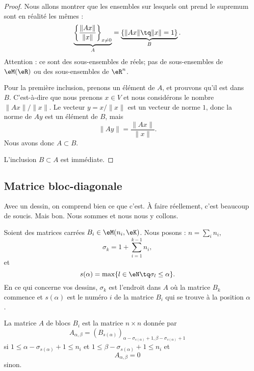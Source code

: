 \begin{proof}
	Nous allons montrer que les ensembles sur lesquels ont prend le supremum sont en réalité les mêmes :
	\begin{equation}
		\underbrace{\left\{ \frac{ \| Ax \| }{ \| x \| }\right\}_{x\neq 0}}_{A}=\underbrace{\left\{ \| Ax \|\tq \| x \|=1 \right\}}_{B}.
	\end{equation}
	Attention : ce sont des sous-ensembles de réels; pas de sous-ensembles de \( \eM(\eR)\) ou des sous-ensembles de \( \eR^n\).

	Pour la première inclusion, prenons un élément de \( A\), et prouvons qu'il est dans \( B\). C'est-à-dire que nous prenons \( x\in V\) et nous considérons le nombre \( \| Ax \|/\| x \|\). Le vecteur \( y=x/\| x \|\) est un vecteur de norme \( 1\), donc la norme de \( Ay\) est un élément de \( B\), mais
	\begin{equation}
		\| Ay \|=\frac{ \| Ax \| }{ \| x \| }.
	\end{equation}
	Nous avons donc \( A\subset B\).

	L'inclusion \( B\subset A\) est immédiate.
\end{proof}

\subsection{Matrice bloc-diagonale}

Avec un dessin, on comprend bien ce que c'est. À faire réellement, c'est beaucoup de soucis. Mais bon. Nous sommes  et nous nous y collons.


\begin{definition}	\label{DEFooBPPGooFFMXny}
	Soient des matrices carrées \( B_i\in \eM(n_i,\eK)\). Nous posons : \( n=\sum_in_i\),
	\begin{equation}
		\sigma_k=1+\sum_{i=1}^{k-1}n_i,
	\end{equation}
	et
	\begin{equation}
		s(\alpha)=\max\{ l\in \eN\tq \sigma_l\leq \alpha \}.
	\end{equation}
	En ce qui concerne vos dessins, \( \sigma_k\) est l'endroit dans \( A\) où la matrice \( B_k\) commence et \( s(\alpha)\) est le numéro \( i\) de la matrice \( B_i\) qui se trouve à la position \( \alpha\).

	La matrice  \( A\) de blocs \( B_i\) est la matrice \( n\times n\) donnée par
	\begin{equation}
		A_{\alpha,\beta}= (B_{s(\alpha)})_{\alpha-\sigma_{s(\alpha)}+1,\beta-\sigma_{s(\alpha)}+1}
	\end{equation}
	si \( 1\leq \alpha-\sigma_{s(\alpha)}+1\leq n_i\) et \( 1\leq \beta-\sigma_{s(\alpha)}+1\leq n_i\) et
	\begin{equation}
		A_{\alpha,\beta}=0
	\end{equation}
	sinon.
\end{definition}

